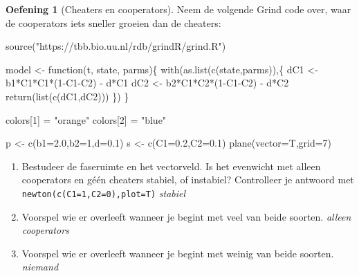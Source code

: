 \documentclass[
  a4paper,
]{scrbook}
\newenvironment{Shaded}{\begin{snugshade}}{\end{snugshade}}
\newcommand{\AttributeTok}[1]{\textcolor[rgb]{0.40,0.45,0.13}{#1}}
\newcommand{\ControlFlowTok}[1]{\textcolor[rgb]{0.00,0.23,0.31}{#1}}
\newcommand{\DecValTok}[1]{\textcolor[rgb]{0.68,0.00,0.00}{#1}}
\newcommand{\FloatTok}[1]{\textcolor[rgb]{0.68,0.00,0.00}{#1}}
\newcommand{\FunctionTok}[1]{\textcolor[rgb]{0.28,0.35,0.67}{#1}}
\newcommand{\NormalTok}[1]{\textcolor[rgb]{0.00,0.23,0.31}{#1}}
\newcommand{\OtherTok}[1]{\textcolor[rgb]{0.00,0.23,0.31}{#1}}
\newcommand{\SpecialCharTok}[1]{\textcolor[rgb]{0.37,0.37,0.37}{#1}}
\newcommand{\StringTok}[1]{\textcolor[rgb]{0.13,0.47,0.30}{#1}}
\providecommand{\tightlist}{%
  \setlength{\itemsep}{0pt}\setlength{\parskip}{0pt}}\usepackage{longtable,booktabs,array}
\theoremstyle{definition}
\newtheorem{exercise}{Oefening}[chapter]
\theoremstyle{remark}
\begin{document}
\begin{exercise}[Cheaters en
cooperators]
Neem de volgende Grind code over, waar de cooperators iets sneller
groeien dan de cheaters:

\begin{Shaded}
\begin{Highlighting}[]
\FunctionTok{source}\NormalTok{(}\StringTok{"https://tbb.bio.uu.nl/rdb/grindR/grind.R"}\NormalTok{)}

\NormalTok{model }\OtherTok{\textless{}{-}} \ControlFlowTok{function}\NormalTok{(t, state, parms)\{}
  \FunctionTok{with}\NormalTok{(}\FunctionTok{as.list}\NormalTok{(}\FunctionTok{c}\NormalTok{(state,parms)),\{}
\NormalTok{    dC1 }\OtherTok{\textless{}{-}}\NormalTok{ b1}\SpecialCharTok{*}\NormalTok{C1}\SpecialCharTok{*}\NormalTok{C1}\SpecialCharTok{*}\NormalTok{(}\DecValTok{1}\SpecialCharTok{{-}}\NormalTok{C1}\SpecialCharTok{{-}}\NormalTok{C2) }\SpecialCharTok{{-}}\NormalTok{ d}\SpecialCharTok{*}\NormalTok{C1}
\NormalTok{    dC2 }\OtherTok{\textless{}{-}}\NormalTok{ b2}\SpecialCharTok{*}\NormalTok{C1}\SpecialCharTok{*}\NormalTok{C2}\SpecialCharTok{*}\NormalTok{(}\DecValTok{1}\SpecialCharTok{{-}}\NormalTok{C1}\SpecialCharTok{{-}}\NormalTok{C2) }\SpecialCharTok{{-}}\NormalTok{ d}\SpecialCharTok{*}\NormalTok{C2}
    \FunctionTok{return}\NormalTok{(}\FunctionTok{list}\NormalTok{(}\FunctionTok{c}\NormalTok{(dC1,dC2)))}
\NormalTok{  \})}
\NormalTok{\}  }

\NormalTok{colors[}\DecValTok{1}\NormalTok{] }\OtherTok{=} \StringTok{"orange"}
\NormalTok{colors[}\DecValTok{2}\NormalTok{] }\OtherTok{=} \StringTok{"blue"}

\NormalTok{p }\OtherTok{\textless{}{-}} \FunctionTok{c}\NormalTok{(}\AttributeTok{b1=}\FloatTok{2.0}\NormalTok{,}\AttributeTok{b2=}\DecValTok{1}\NormalTok{,}\AttributeTok{d=}\FloatTok{0.1}\NormalTok{)}
\NormalTok{s }\OtherTok{\textless{}{-}} \FunctionTok{c}\NormalTok{(}\AttributeTok{C1=}\FloatTok{0.2}\NormalTok{,}\AttributeTok{C2=}\FloatTok{0.1}\NormalTok{)}
\FunctionTok{plane}\NormalTok{(}\AttributeTok{vector=}\NormalTok{T,}\AttributeTok{grid=}\DecValTok{7}\NormalTok{)}
\end{Highlighting}
\end{Shaded}

\begin{enumerate}
\def\labelenumi{\alph{enumi}.}
\setcounter{enumi}{3}
\tightlist
\item
  Bestudeer de faseruimte en het vectorveld. Is het evenwicht met alleen
  cooperators en géén cheaters stabiel, of instabiel? Controlleer je
  antwoord met \texttt{newton(c(C1=1,C2=0),plot=T)} \emph{stabiel}
\item
  Voorspel wie er overleeft wanneer je begint met veel van beide
  soorten. \emph{alleen cooperators}
\item
  Voorspel wie er overleeft wanneer je begint met weinig van beide
  soorten. \emph{niemand}
\end{enumerate}


\end{exercise}
\end{document}
